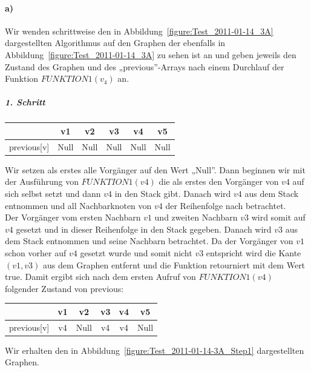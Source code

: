 \documentclass[a4paper, 12pt]{article}
\begin{document}
\paragraph{a)}

Wir wenden schrittweise den in Abbildung~\ref{figure:Test_2011-01-14_3A}  dargestellten Algorithmus auf den Graphen der ebenfalls in Abbildung~\ref{figure:Test_2011-01-14_3A} zu sehen ist an und geben jeweils den Zustand des Graphen und des „previous”-Arrays nach einem Durchlauf der Funktion $FUNKTION1(v_4)$ an.

\subparagraph{1. Schritt}

\begin{center}
	\begin{tabular}{lccccc}
					& v1	& v2	& v3 & v4	& v5\\
		\hline
		previous[v] & Null	& Null	& Null	& Null	& Null \\
	\end{tabular}
\end{center}

Wir setzen als erstes alle Vorgänger auf den Wert „Null”. Dann beginnen wir mit der Ausführung von $FUNKTION1(v4)$ die als erstes den Vorgänger von $v4$ auf sich selbst setzt und dann $v4$ in den Stack gibt. Danach wird $v4$ aus dem Stack entnommen und all Nachbarknoten von $v4$ der Reihenfolge nach betrachtet.\\

Der Vorgänger vom ersten Nachbarn $v1$ und zweiten Nachbarn $v3$ wird somit auf $v4$ gesetzt und in dieser Reihenfolge in den Stack gegeben. Danach wird $v3$ aus dem Stack entnommen und seine Nachbarn betrachtet. Da der Vorgänger von $v1$ schon vorher auf $v4$ gesetzt wurde und somit nicht $v3$ entspricht wird die Kante $(v1,v3)$ aus dem Graphen entfernt und die Funktion retourniert mit dem Wert true. Damit ergibt sich nach dem ersten Aufruf von $FUNKTION1(v4)$ folgender Zustand von previous:

\begin{center}
	\begin{tabular}{lccccc}
					& v1	& v2	& v3 & v4	& v5\\
		\hline
		previous[v] & v4	& Null	& v4 & v4	& Null\\
	\end{tabular}
\end{center}

Wir erhalten den in Abbildung~\ref{figure:Test_2011-01-14-3A_Step1} dargestellten Graphen.
\end{document}

